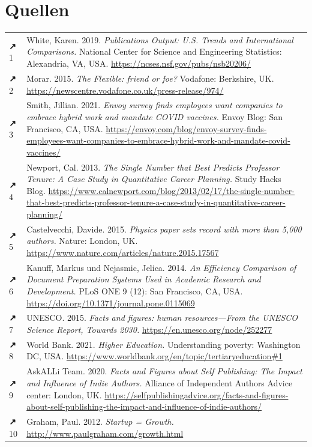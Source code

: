 \documentclass[11pt, a4paper]{article}
\let\oldsection\section
\renewcommand\section{\clearpage\oldsection}
\begin{document}
\section*{Quellen}
\begin{tabular}{l p{}}
    \textbf{↗} 1 & White, Karen. 2019. \emph{Publications Output: U.S. Trends and International Comparisons.} National Center for Science and Engineering Statistics: Alexandria, VA, USA. \url{https://ncses.nsf.gov/pubs/nsb20206/} \\
    \textbf{↗} 2 & Morar. 2015. \emph{The Flexible: friend or foe?} Vodafone: Berkshire, UK. \url{https://newscentre.vodafone.co.uk/press-release/974/} \\
    \textbf{↗} 3 & Smith, Jillian. 2021. \emph{Envoy survey finds employees want companies to embrace hybrid work and mandate COVID vaccines.} Envoy Blog: San Francisco, CA, USA. \url{https://envoy.com/blog/envoy-survey-finds-employees-want-companies-to-embrace-hybrid-work-and-mandate-covid-vaccines/} \\
    \textbf{↗} 4 & Newport, Cal. 2013. \emph{The Single Number that Best Predicts Professor Tenure: A Case Study in Quantitative Career Planning.} Study Hacks Blog. \url{https://www.calnewport.com/blog/2013/02/17/the-single-number-that-best-predicts-professor-tenure-a-case-study-in-quantitative-career-planning/} \\
    \textbf{↗} 5 & Castelvecchi, Davide. 2015. \emph{Physics paper sets record with more than 5,000 authors.} Nature: London, UK. \url{https://www.nature.com/articles/nature.2015.17567} \\
    \textbf{↗} 6 & Kanuff, Markus und Nejasmic, Jelica. 2014. \emph{An Efficiency Comparison of Document Preparation Systems Used in Academic Research and Development.} PLoS ONE 9 (12): San Francisco, CA, USA. \url{https://doi.org/10.1371/journal.pone.0115069} \\
    \textbf{↗} 7 & UNESCO. 2015. \emph{Facts and figures: human resources---From the UNESCO Science Report, Towards 2030.} \url{https://en.unesco.org/node/252277} \\
    \textbf{↗} 8 & World Bank. 2021. \emph{Higher Education.} Understanding poverty: Washington DC, USA. \url{https://www.worldbank.org/en/topic/tertiaryeducation#1} \\
    \textbf{↗} 9 & AskALLi Team. 2020. \emph{Facts and Figures about Self Publishing: The Impact and Influence of Indie Authors.} Alliance of Independent Authors Advice center: London, UK. \url{https://selfpublishingadvice.org/facts-and-figures-about-self-publishing-the-impact-and-influence-of-indie-authors/} \\
    \textbf{↗} 10 & Graham, Paul. 2012. \emph{Startup = Growth.} \url{http://www.paulgraham.com/growth.html} \\
\end{tabular}
\end{document}
